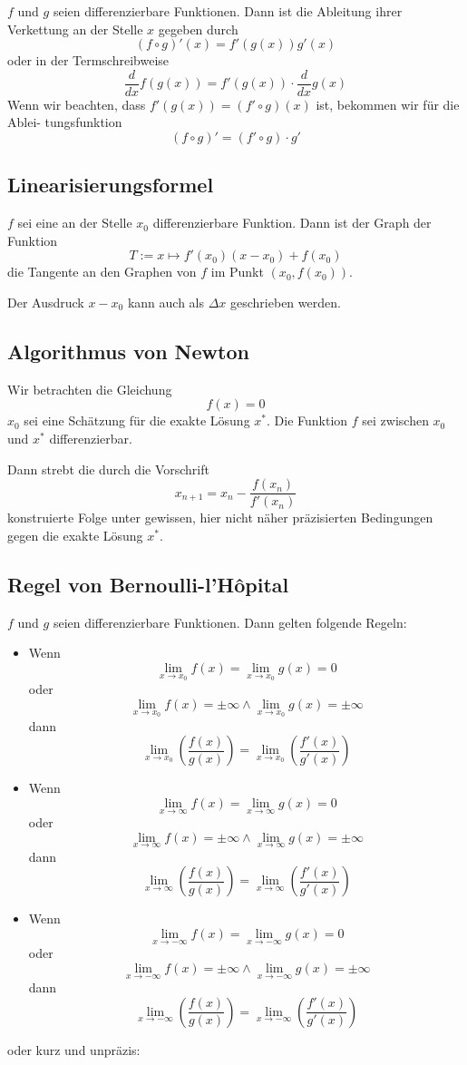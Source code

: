 \documentclass[10pt,a4paper]{article}
\begin{document}
$f$ und $g$ seien differenzierbare Funktionen. Dann ist die Ableitung ihrer Verkettung an der Stelle $x$ gegeben durch
$$(f \circ g)'(x) = f'(g(x))g'(x)$$
oder in der Termschreibweise
$$\frac{d}{dx}f(g(x)) = f'(g(x)) \cdot \frac{d}{dx}g(x)$$
Wenn wir beachten, dass $f'(g(x)) = (f' \circ g)(x)$ ist, bekommen wir für die Ablei-
tungsfunktion
$$(f \circ g)' = (f' \circ g) \cdot g'$$


\subsection{Linearisierungsformel}

$f$ sei eine an der Stelle $x_0$ differenzierbare Funktion. Dann ist der Graph der Funktion
$$T := x \mapsto f'(x_0)(x-x_0) + f(x_0)$$
die Tangente an den Graphen von $f$ im Punkt $(x_0, f(x_0))$.

Der Ausdruck $x - x_0$ kann auch als $\Delta x$ geschrieben werden.


\subsection{Algorithmus von Newton}

Wir betrachten die Gleichung
$$f(x) = 0$$
$x_0$ sei eine Schätzung für die exakte Lösung $x^*$. Die Funktion $f$ sei zwischen $x_0$ und $x^*$ differenzierbar.

Dann strebt die durch die Vorschrift
$$x_{n+1} = x_n - \frac{f(x_n)}{f'(x_n)}$$
konstruierte Folge unter gewissen, hier nicht näher präzisierten Bedingungen gegen die exakte Lösung $x^*$.


\subsection{Regel von Bernoulli-l'Hôpital}

$f$ und $g$ seien differenzierbare Funktionen. Dann gelten folgende Regeln:

\begin{itemize}
	\item Wenn
	$$\lim_{x \to x_0}f(x) = \lim_{x \to x_0}g(x) = 0$$
	oder $$\lim_{x \to x_0}f(x) = \pm \infty \wedge \lim_{x \to x_0}g(x) = \pm \infty$$
	dann $$\lim_{x \to x_0}\left(\frac{f(x)}{g(x)}\right) = \lim_{x \to x_0}\left(\frac{f'(x)}{g'(x)}\right)$$
	\item Wenn
	$$\lim_{x \to \infty}f(x) = \lim_{x \to \infty}g(x) = 0$$
	oder $$\lim_{x \to \infty}f(x) = \pm \infty \wedge \lim_{x \to \infty}g(x) = \pm \infty$$
	dann $$\lim_{x \to \infty}\left(\frac{f(x)}{g(x)}\right) = \lim_{x \to \infty}\left(\frac{f'(x)}{g'(x)}\right)$$
	\item Wenn
	$$\lim_{x \to -\infty}f(x) = \lim_{x \to -\infty}g(x) = 0$$
	oder $$\lim_{x \to -\infty}f(x) = \pm \infty \wedge \lim_{x \to -\infty}g(x) = \pm \infty$$
	dann $$\lim_{x \to -\infty}\left(\frac{f(x)}{g(x)}\right) = \lim_{x \to -\infty}\left(\frac{f'(x)}{g'(x)}\right)$$
\end{itemize}
oder kurz und unpräzis:
\end{document}
